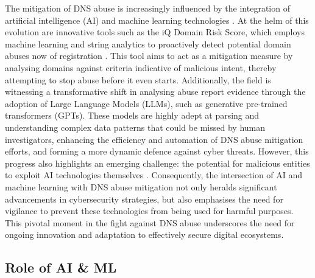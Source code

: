 The mitigation of DNS abuse is increasingly influenced by the integration of artificial intelligence (AI) and machine learning technologies \cite{goethals2021enabling}. At the helm of this evolution are innovative tools such as the iQ Domain Risk Score, which employs machine learning and string analytics to proactively detect potential domain abuses now of registration \cite{dnsabuseAI2023}. This tool aims to act as a mitigation measure by analysing domains against criteria indicative of malicious intent, thereby attempting to stop abuse before it even starts. Additionally, the field is witnessing a transformative shift in analysing abuse report evidence through the adoption of Large Language Models (LLMs), such as generative pre-trained transformers (GPTs). These models are highly adept at parsing and understanding complex data patterns that could be missed by human investigators, enhancing the efficiency and automation of DNS abuse mitigation efforts, and forming a more dynamic defence against cyber threats. However, this progress also highlights an emerging challenge: the potential for malicious entities to exploit AI technologies themselves \cite{halvorsenAI2023}.  Consequently, the intersection of AI and machine learning with DNS abuse mitigation not only heralds significant advancements in cybersecurity strategies, but also emphasises the need for vigilance to prevent these technologies from being used for harmful purposes. This pivotal moment in the fight against DNS abuse underscores the need for ongoing innovation and adaptation to effectively secure digital ecosystems.

\subsection{Role of AI \& ML}

